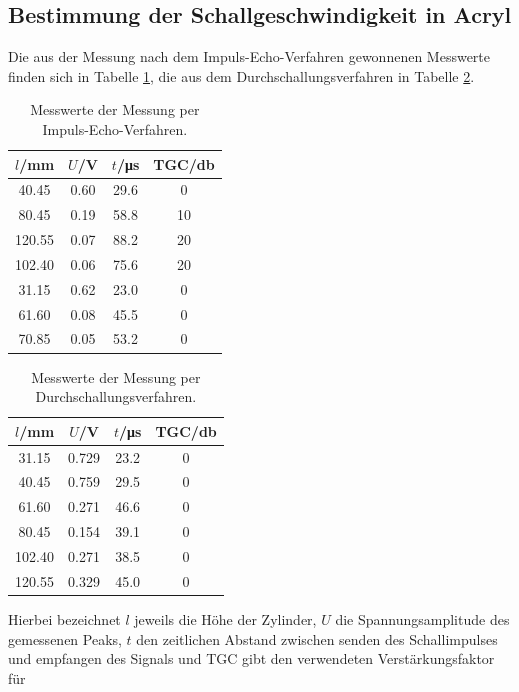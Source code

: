 \documentclass[
  bibliography=totoc,     %
  captions=tableheading,  %
  titlepage=firstiscover, %
]{scrartcl}
\begin{document}
\subsection{Bestimmung der Schallgeschwindigkeit in Acryl}
Die aus der Messung nach dem Impuls-Echo-Verfahren gewonnenen Messwerte finden sich
in Tabelle \ref{tab:1}, die aus dem Durchschallungsverfahren in Tabelle \ref{tab:2}.
  \begin{table}
    \centering
    \begin{tabular}{c c c c}
      \toprule
      $l$/\si{\milli\metre} & $U$/\si{\volt} & $t$/\si{\micro\second} & TGC/\si{\decibel} \\
      \midrule
      40.45  & 0.60 & 29.6 & 0  \\
      80.45  & 0.19 & 58.8 & 10 \\
      120.55 & 0.07 & 88.2 & 20 \\
      102.40 & 0.06 & 75.6 & 20 \\
      31.15  & 0.62 & 23.0 & 0  \\
      61.60  & 0.08 & 45.5 & 0  \\
      70.85  & 0.05 & 53.2 & 0  \\
      \bottomrule
    \end{tabular}
    \caption{Messwerte der Messung per Impuls-Echo-Verfahren.}
    \label{tab:1}
  \end{table}
  \begin{table}
    \centering
    \begin{tabular}{c c c c}
      \toprule
      $l$/\si{\milli\metre} & $U$/\si{\volt} & $t$/\si{\micro\second} & TGC/\si{\decibel} \\
      \midrule
      31.15  & 0.729 & 23.2 & 0 \\
      40.45  & 0.759 & 29.5 & 0 \\
      61.60  & 0.271 & 46.6 & 0 \\
      80.45  & 0.154 & 39.1 & 0 \\
      102.40 & 0.271 & 38.5 & 0 \\
      120.55 & 0.329 & 45.0 & 0 \\
      \bottomrule
    \end{tabular}
    \caption{Messwerte der Messung per Durchschallungsverfahren.}
    \label{tab:2}
\end{table}
Hierbei bezeichnet $l$ jeweils die Höhe der Zylinder, $U$ die Spannungsamplitude des
gemessenen Peaks, $t$ den zeitlichen Abstand zwischen senden des Schallimpulses
und empfangen des Signals und TGC gibt den verwendeten Verstärkungsfaktor für
\end{document}
